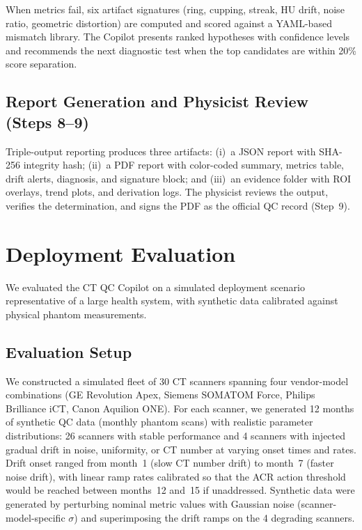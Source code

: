 \documentclass[11pt]{article}
\begin{document}
When metrics fail, six artifact signatures (ring, cupping, streak,
HU drift, noise ratio, geometric distortion) are computed and scored
against a YAML-based mismatch library.
The Copilot presents ranked hypotheses with confidence levels and
recommends the next diagnostic test when the top candidates are
within 20\% score separation.

\subsection{Report Generation and Physicist Review (Steps 8--9)}

Triple-output reporting produces three artifacts:
(i)~a JSON report with SHA-256 integrity hash;
(ii)~a PDF report with color-coded summary, metrics table, drift
alerts, diagnosis, and signature block; and
(iii)~an evidence folder with ROI overlays, trend plots, and
derivation logs.
The physicist reviews the output, verifies the determination, and
signs the PDF as the official QC record (Step~9).


\section{Deployment Evaluation}
\label{sec:evaluation}

We evaluated the CT QC Copilot on a simulated deployment scenario
representative of a large health system, with synthetic data
calibrated against physical phantom measurements.

\subsection{Evaluation Setup}

We constructed a simulated fleet of 30 CT scanners spanning four
vendor-model combinations (GE Revolution Apex, Siemens SOMATOM
Force, Philips Brilliance iCT, Canon Aquilion ONE).
For each scanner, we generated 12 months of synthetic QC data
(monthly phantom scans) with realistic parameter distributions:
26 scanners with stable performance and 4 scanners with injected
gradual drift in noise, uniformity, or CT number at varying onset
times and rates.
Drift onset ranged from month~1 (slow CT number drift) to month~7
(faster noise drift), with linear ramp rates calibrated so that
the ACR action threshold would be reached between months~12 and~15
if unaddressed.
Synthetic data were generated by perturbing nominal metric values
with Gaussian noise (scanner-model-specific $\sigma$) and
superimposing the drift ramps on the 4 degrading scanners.
\end{document}
